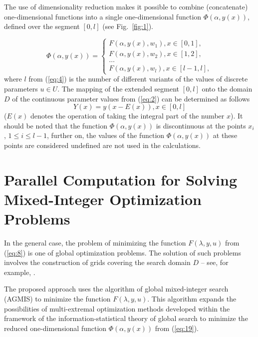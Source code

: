 \documentclass{svproc}
\begin{document}
The use of dimensionality reduction makes it possible to combine (concatenate) one-dimensional functions into a single one-dimensional function $\Phi(\alpha,y(x))$, defined over the segment $[0,l]$ (see Fig.~\ref{fig:1}).

\begin{equation}\label{eq:19}
 \Phi(\alpha,y(x)) = 
\begin{cases}
F(\alpha,y(x),w_1 ),x \in [0,1], \\
F(\alpha,y(x),w_2 ),x \in [1,2], \\
\dots \\
F(\alpha,y(x),w_l ),x \in [l-1,l],
\end{cases}
\end{equation}
where $l$ from (\ref{eq:4}) is the number of different variants of the values of discrete parameters $u \in U$.  The mapping of the extended segment $[0,l]$ onto the domain $D$ of the continuous parameter values from (\ref{eq:2}) can be determined as follows 
\begin{equation}\label{eq:20}
Y(x)=y(x-E(x)),x\in[0,l]
\end{equation}
($E(x)$ denotes the operation of taking the integral part of the number $x$). It should be noted that the function $\Phi(\alpha,y(x))$ is discontinuous at the points $x_i$, $1 \leq i \leq l-1$,  further on, the values of the function $\Phi(\alpha,y(x))$ at these points are considered undefined are not used in the calculations.
 




\section{Parallel Computation for Solving Mixed-Integer Optimization Problems}\label{sec:4}

In the general case, the problem of minimizing the function $F(\lambda,y,u)$ from (\ref{eq:8}) is one of  global optimization problems. The solution of such problems involves the construction of grids covering the search domain $D$ -- see, for example, \cite{c24,c25,c26,c27,c28,c29,c30,c31}.
 
The proposed approach uses the algorithm of global mixed-integer search (AGMIS) to minimize the function $F(\lambda,y,u)$. This algorithm expands the possibilities of multi-extremal optimization methods developed within the framework of the information-statistical theory of global search \cite{c19,c20,c21,c22,c23,c32,c33,c34,c35,c36,c37,c38,c39} to minimize the reduced one-dimensional function $\Phi(\alpha,y(x))$ from (\ref{eq:19}).
 
\end{document}
